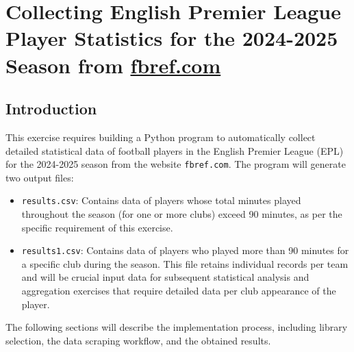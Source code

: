 \documentclass[12pt, a4paper]{report}
\begin{document}
\chapter{Collecting English Premier League Player Statistics for the 2024-2025 Season from \href{http://fbref.com}{fbref.com}}
\author{}
\date{}

\section{Introduction}
This exercise requires building a Python program to automatically collect detailed statistical data of football players in the English Premier League (EPL) for the 2024-2025 season from the website \texttt{fbref.com}.
The program will generate two output files:
\begin{itemize}
\renewcommand{\labelitemi}{}
    \item \texttt{results.csv}: Contains data of players whose total minutes played throughout the season (for one or more clubs) exceed 90 minutes, as per the specific requirement of this exercise.
    \item \texttt{results1.csv}: Contains data of players who played more than 90 minutes for a specific club during the season. This file retains individual records per team and will be crucial input data for subsequent statistical analysis and aggregation exercises that require detailed data per club appearance of the player.
\end{itemize}
The following sections will describe the implementation process, including library selection, the data scraping workflow, and the obtained results.
\end{document}
